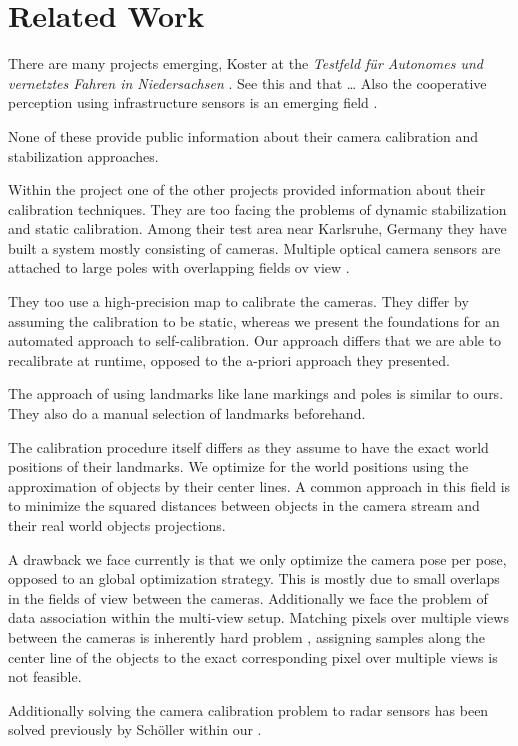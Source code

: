\section{Related Work}
There are many \ITS{} projects emerging, \eg{} Koster \etal{} at the \emph{Testfeld für Autonomes und vernetztes Fahren in Niedersachsen} \cite{koster2017testfeld}. See \eg{} this and that \dots
Also the cooperative perception using infrastructure sensors is an emerging field \cite{arnold2020cooperative}.

None of these provide public information about their camera calibration and stabilization approaches.

Within the \TAADBW{} project one of the other projects provided information about their calibration techniques.
They are too facing the problems of dynamic stabilization and static calibration.
Among their test area near Karlsruhe, Germany they have built a system mostly consisting of cameras.
Multiple optical camera sensors are attached to large poles with overlapping fields ov view \cite{fleck2018towards}.

They too use a high-precision map to calibrate the cameras. 
They differ by assuming the calibration to be static, whereas we present the foundations for an automated approach to self-calibration.
Our approach differs that we are able to recalibrate at runtime, opposed to the a-priori approach they presented.

The approach of using landmarks like lane markings and poles is similar to ours.
They also do a manual selection of landmarks beforehand.

The calibration procedure itself differs as they assume to have the exact world positions of their landmarks.
We optimize for the world positions using the approximation of objects by their center lines. 
A common approach in this field is to minimize the squared distances between objects in the camera stream and their real world objects projections.

A drawback we face currently is that we only optimize the camera pose per pose, opposed to an global optimization strategy. 
This is mostly due to small overlaps in the fields of view \cite{kraemmer2020providentia} between the cameras.
Additionally we face the problem of data association within the multi-view setup. 
Matching pixels over multiple views between the cameras is inherently hard problem \cite{agrawal2008censure},
assigning samples along the center line of the objects to the exact corresponding pixel over multiple views is not feasible.

Additionally solving the camera calibration problem to radar sensors has been solved previously by Schöller \etal{} within our \Providentia{}.